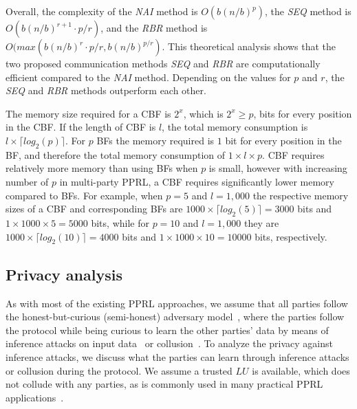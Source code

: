\documentclass{sig-alternate}
\begin{document}
Overall, the complexity of the \emph{NAI} method is $O(b(n/b)^p)$,
the \emph{SEQ} method is $O(b(n/b)^{r+1} \cdot p/r)$, and the
\emph{RBR} method is $O(max(b(n/b)^r \cdot p/r,b(n/b)^{p/r})$.
This theoretical analysis shows that
the two proposed communication methods \emph{SEQ} and \emph{RBR} 
are computationally efficient
compared to the \emph{NAI} method. Depending on the values for
$p$ and $r$, the \emph{SEQ} and \emph{RBR} methods outperform
each other.

The memory size required for a CBF is $2^x$, which is $2^x \ge p$,
bits for every position in the CBF. If the length of CBF is $l$,
the total memory consumption is $l \times \lceil log_2(p) \rceil$. For $p$ BFs
the memory required is $1$ bit for every position in the BF, 
and therefore the total memory consumption of $1 \times l \times p$. 
CBF requires relatively more memory than using BFs when $p$ is small, 
however with increasing
number of $p$ in multi-party PPRL, a CBF requires significantly
lower memory compared to BFs.
For example, when $p=5$ and $l=1,000$ the respective
memory sizes of a CBF and corresponding BFs are 
$1000 \times \lceil log_2(5) \rceil = 3000$ bits
and $1 \times 1000 \times 5 = 5000$ bits, while for $p=10$ and $l=1,000$
they are $1000 \times \lceil log_2(10) \rceil = 4000$ bits
and $1 \times 1000 \times 10 = 10000$ bits, respectively.

\subsection{Privacy analysis}
\label{subsec_privacy_analsis}

As with most of the existing PPRL approaches,
we assume that all parties follow
the 
honest-but-curious 
(semi-honest) adversary model~\cite{Vat13}, 
where
the parties follow the protocol while being 
curious to learn the other parties' data 
by means of inference attacks on input data~\cite{Vat14}
or collusion~\cite{Vat13}.
To analyze the privacy against inference attacks, 
we discuss what the parties can learn through inference
attacks or collusion during the protocol.
We assume a trusted
$LU$ is available, which does not collude with any parties,
as is commonly used in many practical PPRL applications~\cite{Ran13}.
\end{document}
